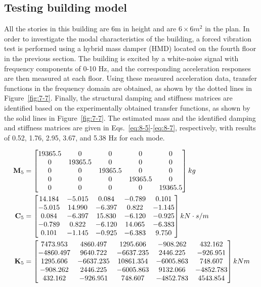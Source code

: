 \subsection{Testing building model}

All the stories in this building are 6m in height and are $6\times6m^{2}$ in the plan. In order to investigate the modal characteristics of the building, a forced vibration test is performed using a hybrid mass damper (HMD) located on the fourth floor in the previous section. The building is excited by a white-noise signal with frequency components of 0-10 Hz, and the corresponding acceleration responses are then measured at each floor. Using these measured acceleration data, transfer functions in the frequency domain are obtained, as shown by the dotted lines in Figure~\ref{fig:7-7}. Finally, the structural damping and stiffness matrices are identified based on the experimentally obtained transfer functions, as shown by the solid lines in Figure~\ref{fig:7-7}. The estimated mass and the identified damping and stiffness matrices are given in Eqs.~\eqref{eq:8-5}-\eqref{eq:8-7}, respectively, with results of 0.52, 1.76, 2.95, 3.67, and 5.38 Hz for each mode.


\begin{align}
\mathbf{M}_{5} & = \begin{bmatrix} 19365.5 & 0 & 0 & 0 & 0\\ 0 & 19365.5 & 0 & 0 & 0 \\ 0 & 0 & 19365.5 & 0 & 0 \\ 0 & 0 & 0 & 19365.5 & 0 \\ 0 & 0 & 0 & 0 & 19365.5\end{bmatrix}kg \label{eq:8-5} \\
\mathbf{C}_{5} & = \begin{bmatrix} 14.184 & -5.015 & 0.084  & -0.789 & 0.101 \\ -5.015 & 14.990  & -6.397 & 0.822 & -1.145 \\ 0.084  & -6.397 & 15.830  & -6.120  & -0.925 \\ -0.789 & 0.822  & -6.120 & 14.065  & -6.383 \\ 0.101 & -1.145  & -0.925  & -6.383 & 9.750\end{bmatrix}kN\cdot s/m \label{eq:8-6} \\
\mathbf{K}_{5} & = \begin{bmatrix} 7473.953 & 4860.497 & 1295.606 & -908.262 & 432.162 \\ -4860.497 & 9640.722 & -6637.235 & 2446.225 & -926.951 \\ 1295.606 & -6637.235 & 10861.354 & -6005.863 & 748.607 \\ -908.262 & 2446.225 & -6005.863 & 9132.066 & -4852.783 \\ 432.162 & -926.951 & 748.607 & -4852.783 & 4543.854\end{bmatrix}kN\/m \label{eq:8-7}
\end{align}

